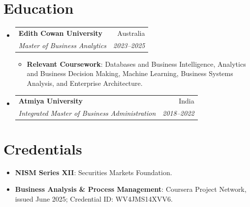 \documentclass[letterpaper,9.5pt]{article}
\makeatletter
\newcommand{\resumeItem}[2]{
  \item\small{
    \textbf{#1}{: #2 \vspace{-2pt}}
  }
}
\newcommand{\resumeSubheading}[4]{
  \vspace{-1pt}\item
    \begin{tabular*}{0.97\textwidth}{l@{\extracolsep{\fill}}r}
      \textbf{#1} & #2 \\
      \textit{\small #3} & \textit{\small #4} \\
    \end{tabular*}\vspace{-5pt}
}
\newcommand{\resumeSubItem}[2]{\resumeItem{#1}{#2}\vspace{-4pt}}
\newcommand{\resumeSubHeadingListStart}{\begin{itemize}[leftmargin=*]}
\newcommand{\resumeSubHeadingListEnd}{\end{itemize}}
\newcommand{\resumeItemListStart}{\begin{itemize}}
\newcommand{\resumeItemListEnd}{\end{itemize}\vspace{-5pt}}
\makeatother
\begin{document}
\section{Education}
\resumeSubHeadingListStart
  \resumeSubheading
    {Edith Cowan University}{Australia}
    {Master of Business Analytics}{2023--2025}
    \resumeItemListStart
      \resumeItem{Relevant Coursework}
        {Databases and Business Intelligence, Analytics and Business Decision Making, Machine Learning, Business Systems Analysis, and Enterprise Architecture.}
    \resumeItemListEnd
  \resumeSubheading
    {Atmiya University}{India}
    {Integrated Master of Business Administration}{2018--2022}
\resumeSubHeadingListEnd

\section{Credentials}
\vspace{-2pt}
\resumeSubHeadingListStart
  \resumeSubItem{NISM Series XII}
    {Securities Markets Foundation.}
  \resumeSubItem{Business Analysis \& Process Management}
    {Coursera Project Network, issued June 2025; Credential ID: WV4JMS14XVV6.}
\resumeSubHeadingListEnd
\end{document}

